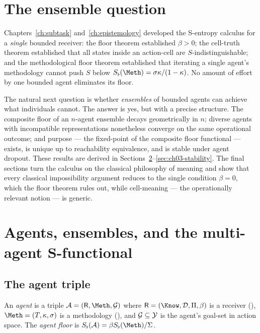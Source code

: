 \section{The ensemble question}
\label{sec:ch03-intro}

Chapters~\ref{ch:subtask} and~\ref{ch:epistemology} developed the S-entropy
calculus for a \emph{single} bounded receiver: the floor theorem established
$\beta>0$; the cell-truth theorem established that all states inside an
action-cell are $S$-indistinguishable; and the methodological floor theorem
established that iterating a single agent's methodology cannot push $S$
below $\Sfloor(\Meth)=\sigma\kappa/(1-\kappa)$. No amount of effort by one
bounded agent eliminates its floor.

The natural next question is whether \emph{ensembles} of bounded agents can
achieve what individuals cannot. The answer is yes, but with a precise
structure. The composite floor of an $n$-agent ensemble decays geometrically
in $n$; diverse agents with incompatible representations nonetheless converge
on the same operational outcome; and purpose --- the fixed-point of the
composite floor functional --- exists, is unique up to reachability
equivalence, and is stable under agent dropout. These results are derived in
Sections~\ref{sec:ch03-multi}--\ref{sec:ch03-stability}. The final sections
turn the calculus on the classical philosophy of meaning and show that every
classical impossibility argument reduces to the single condition $\beta=0$,
which the floor theorem rules out, while cell-meaning --- the operationally
relevant notion --- is generic.

\section{Agents, ensembles, and the multi-agent S-functional}
\label{sec:ch03-multi}

\subsection{The agent triple}

\begin{definition}[Agent]\label{def:agent}
An \emph{agent} is a triple $\agent=(\receiver,\Meth,\Goal)$ where
$\receiver=(\Know,\mathcal{D},\Pi,\beta)$ is a receiver
(), $\Meth=(T,\kappa,\sigma)$ is a methodology
(), and $\mathcal{G}\subseteq\mathcal{Y}$ is the agent's
goal-set in action space. The \emph{agent floor} is
$\Sfloor(\agent)=\beta\Sfloor(\Meth)/\Sigma$.
\end{definition}

